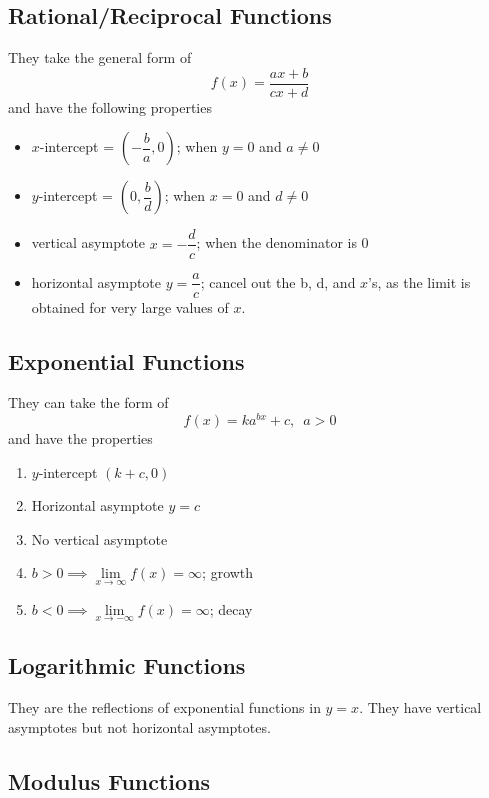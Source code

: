 \documentclass[11pt]{article}
\begin{document}
\subsection{Rational/Reciprocal Functions}

They take the general form of $$f(x) = \frac{ax + b}{cx + d}$$ and have the following properties
\begin{itemize}
  \item $x$-intercept = $(-\dfrac{b}{a}, 0)$; when $y = 0$ and $a\not = 0$
  \item $y$-intercept = $(0, \dfrac{b}{d})$; when $x = 0$ and $d\not = 0$
  \item vertical asymptote $x = -\dfrac{d}{c}$; when the denominator is 0
  \item horizontal asymptote $y = \dfrac{a}{c}$; cancel out the b, d, and $x$'s, as the limit is obtained for very large values of $x$.
\end{itemize}

\pagebreak

\subsection{Exponential Functions}

They can take the form of $$f(x)=ka^{bx} + c,\,\,\, a > 0$$ and have the properties
\begin{enumerate}
  \item $y$-intercept $(k + c, 0)$
  \item Horizontal asymptote $y = c$
  \item No vertical asymptote
  \item $b > 0 \implies \lim\limits_{x\to\infty}f(x) = \infty$; growth
  \item $b < 0 \implies \lim\limits_{x\to-\infty}f(x) = \infty$; decay
\end{enumerate}


\subsection{Logarithmic Functions}

They are the reflections of exponential functions in $y = x$. They have vertical asymptotes but not horizontal asymptotes.

\pagebreak

\subsection{Modulus Functions}
\end{document}
